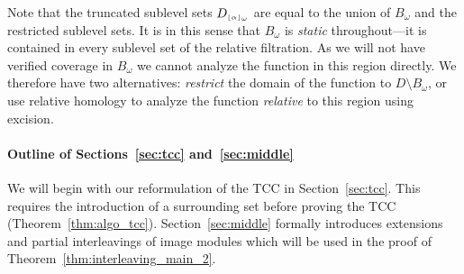 Note that the truncated sublevel sets $D_{\scriptscriptstyle \lfloor\alpha\rfloor_{\omega}}$ are equal to the union of $B_\omega$ and the restricted sublevel sets.
It is in this sense that $B_\omega$ is \emph{static} throughout---it is contained in every sublevel set of the relative filtration.
As we will not have verified coverage in $B_\omega$ we cannot analyze the function in this region directly.
We therefore have two alternatives: \emph{restrict} the domain of the function to $D\setminus B_\omega$, or use relative homology to analyze the function \emph{relative} to this region using excision.

\paragraph*{Outline of Sections~\ref{sec:tcc} and~\ref{sec:middle}}

We will begin with our reformulation of the TCC in Section~\ref{sec:tcc}.
This requires the introduction of a surrounding set before proving the TCC (Theorem~\ref{thm:algo_tcc}).
Section~\ref{sec:middle} formally introduces extensions and partial interleavings of image modules which will be used in the proof of Theorem~\ref{thm:interleaving_main_2}.


%

